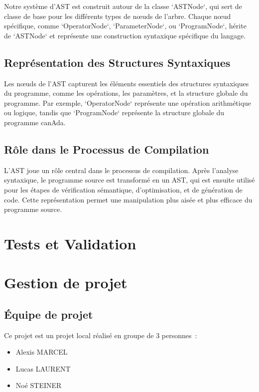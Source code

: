 \documentclass[french,a4paper]{article}
\begin{document}
    Notre système d'AST est construit autour de la classe `ASTNode`, qui sert de classe de base pour les différents types de nœuds de l'arbre. Chaque nœud spécifique, comme `OperatorNode`, `ParameterNode`, ou `ProgramNode`, hérite de `ASTNode` et représente une construction syntaxique spécifique du langage.

    \subsection{Représentation des Structures Syntaxiques}\label{subsec:representation-des-structures-syntaxiques}

    Les nœuds de l'AST capturent les éléments essentiels des structures syntaxiques du programme, comme les opérations, les paramètres, et la structure globale du programme. Par exemple, `OperatorNode` représente une opération arithmétique ou logique, tandis que `ProgramNode` représente la structure globale du programme canAda.

    \subsection{Rôle dans le Processus de Compilation}\label{subsec:role-dans-le-processus-de-compilation}

    L'AST joue un rôle central dans le processus de compilation. Après l'analyse syntaxique, le programme source est transformé en un AST, qui est ensuite utilisé pour les étapes de vérification sémantique, d'optimisation, et de génération de code. Cette représentation permet une manipulation plus aisée et plus efficace du programme source.

    \section{Tests et Validation}\label{sec:tests-et-validation}


    \section{Gestion de projet}\label{sec:gestion-de-projet}

    \subsection{Équipe de projet}\label{subsec:equipe-de-projet}
    Ce projet est un projet local réalisé en groupe de 3 personnes~:
    \begin{itemize}
        \item Alexis MARCEL
        \item Lucas LAURENT
        \item Noé STEINER
    \end{itemize}
\end{document}
